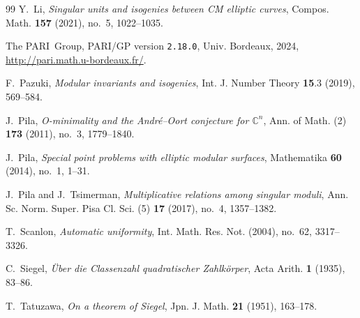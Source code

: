 \documentclass[12pt,a4paper,oneside]{amsart}
\begin{document}
\begin{thebibliography}{99}
Y.~Li, \emph{Singular units and isogenies between {CM} elliptic curves},
  Compos. Math. \textbf{157} (2021), no.~5, 1022--1035.
	
    The PARI~Group, PARI/GP version \texttt{2.18.0}, Univ. Bordeaux, 2024,
    \url{http://pari.math.u-bordeaux.fr/}.
    
    F.~Pazuki, \emph{Modular invariants and isogenies}, Int. J. Number Theory \textbf{15}.3 (2019), 569--584.
	
J.~Pila, \emph{O-minimality and the {A}ndr\'e--{O}ort conjecture for {$\mathbb{
  C}^n$}}, Ann. of Math. (2) \textbf{173} (2011), no.~3, 1779--1840.
  
J.~Pila, \emph{Special point problems with elliptic modular surfaces},
  Mathematika \textbf{60} (2014), no.~1, 1--31.
  
J.~Pila and J.~Tsimerman, \emph{Multiplicative relations among singular
  moduli}, Ann. Sc. Norm. Super. Pisa Cl. Sci. (5) \textbf{17} (2017), no.~4,
  1357--1382.

T.~Scanlon, \emph{Automatic uniformity}, Int. Math. Res. Not. (2004), no.~62,
  3317--3326.
	
C.~Siegel, \emph{{\"U}ber die {Classenzahl} quadratischer {Zahlk{\"o}rper}},
  Acta Arith. \textbf{1} (1935), 83--86.
	
T.~Tatuzawa, \emph{On a theorem of {S}iegel}, Jpn. J. Math. \textbf{21} (1951),
  163--178.
	
\end{thebibliography}
	
\end{document}
